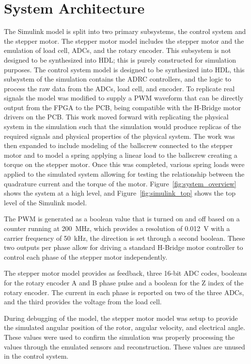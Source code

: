 \section{System Architecture}\label{systemArchitecture}
The Simulink model is split into two primary subsystems, the control system and the stepper motor. The stepper motor model includes the stepper motor and the emulation of load cell, ADCs, and the rotary encoder. This subsystem is not designed to be synthesized into HDL; this is purely constructed for simulation purposes. The control system model is designed to be synthesized into HDL, this subsystem of the simulation contains the ADRC controllers, and the logic to process the raw data from the ADCs, load cell, and encoder. To replicate real signals the model was modified to supply a PWM waveform that can be directly output from the FPGA to the PCB, being compatible with the H-Bridge motor drivers on the PCB. This work moved forward with replicating the physical system in the simulation such that the simulation would produce replicas of the required signals and physical properties of the physical system. The work was then expanded to include modeling of the ballscrew connected to the stepper motor and to model a spring applying a linear load to the ballscrew creating a torque on the stepper motor. Once this was completed, various spring loads were applied to the simulated system allowing for testing the relationship between the quadrature current and the torque of the motor. Figure~\ref{fig:system_overview} shows the system at a high level, and Figure~\ref{fig:simulink_top} shows the top level of the Simulink model.


The PWM is generated as a boolean value that is turned on and off based on a counter running at \SI{200}{\mega\hertz}, which provides a resolution of \SI{0.012}{\volt} with a carrier frequency of \SI{50}{\kilo\hertz}, the direction is set through a second boolean. These two outputs per phase allow for driving a standard H-Bridge motor controller to control each phase of the stepper motor independently.

The stepper motor model provides as feedback, three 16-bit ADC codes, booleans for the rotary encoder A and B phase pulse and a boolean for the Z index of the rotary encoder. The current in each phase is reported on two of the three ADCs, and the third provides the voltage from the load cell.

During debugging of the model, the stepper motor model was setup to provide the simulated angular position of the rotor, angular velocity, and electrical angle. These values were used to confirm the simulation was properly processing the values through the emulated sensors and reconstruction. These values are unused in the control system.

